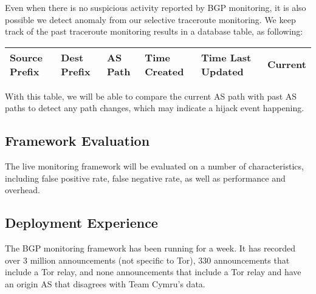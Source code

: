 \begin{itemize}
Even when there is no suspicious activity reported by BGP monitoring, it is also possible we detect anomaly from our selective traceroute monitoring. We keep track of the past traceroute monitoring results in a database table, as following:
\begin{center}
\begin{tabular}{ p{8mm} | p{8mm} | p{6mm} | p{1cm} | p{1.1cm} | p{8mm}}
  \hline			
  Source Prefix & Dest Prefix & AS Path & Time Created & Time Last Updated & Current \\
  \hline  
\end{tabular}
\label{tab:pathinfo}
\end{center}
With this table, we will be able to compare the current AS path with past AS paths to detect any path changes, which may indicate a hijack event happening. 

\end{itemize}


\subsection{Framework Evaluation}
The live monitoring framework will be evaluated on a number of characteristics, including false positive rate, false negative rate, as well as performance and overhead.

\subsection{Deployment Experience}
The BGP monitoring framework has been running for a week.  It has recorded over 3 million announcements (not specific to Tor), 330 announcements that include a Tor relay, and none announcements that include a Tor relay and have an origin AS that disagrees with Team Cymru's data.  
